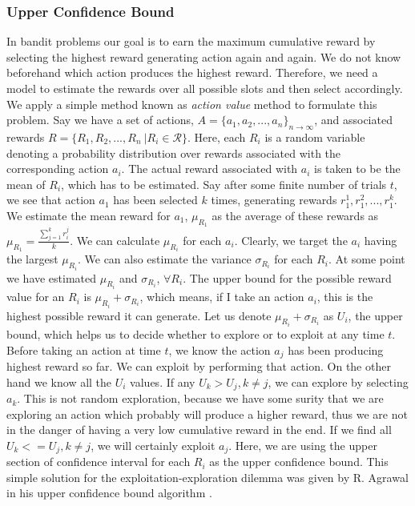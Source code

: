 \documentclass[english]{tktltiki}
\begin{document}
\subsubsection{Upper Confidence Bound}
\label{sec:UCB}
In bandit problems our goal is to earn the maximum cumulative reward by selecting the highest reward generating action again and again. We do not know beforehand which action produces the highest reward. Therefore, we need a model to estimate the rewards over all possible slots and then select accordingly. We apply a simple method known as \textit{action value} method \cite{reinforcement_learning} to formulate this problem. Say we have a set of actions, $A = \{a_1, a_2, ..., a_n\}_{n \to \infty}$, and associated rewards $R = \{R_1, R_2, ..., R_n\ | R_i \in \mathcal{R}\}$. Here, each $R_i$ is a random variable denoting a probability distribution over rewards associated with the corresponding action $a_i$. The actual reward associated with $a_i$ is taken to be the mean of $R_i$, which has to be estimated. Say after some finite number of trials $t$, we see that action $a_1$ has been selected $k$ times, generating rewards $r_1^1, r_1^2, ..., r_1^k$. We estimate the mean reward for $a_1$, $\mu_{R_1}$ as the average of these rewards as $\mu_{R_1} = \frac{\sum_{j = 1}^k{r_i^j}}{k}$. We can calculate $\mu_{R_i}$ for each $a_i$. Clearly, we target the $a_i$ having the largest $\mu_{R_i}$. We can also estimate the variance $\sigma_{R_i}$ for each $R_i$. At some point we have estimated $\mu_{R_i}$ and $\sigma_{R_i}$, $\forall R_i$. The upper bound for the possible reward value for an $R_i$ is $\mu_{R_i} + \sigma_{R_i}$, which means, if I take an action $a_i$, this is the highest possible reward it can generate. Let us denote $\mu_{R_i} + \sigma_{R_i}$ as $U_i$, the upper bound, which helps us to decide whether to explore or to exploit at any time $t$. Before taking an action at time $t$, we know the action $a_j$ has been producing highest reward so far. We can exploit by performing that action. On the other hand we know all the $U_i$ values. If any $U_k > U_j, k \neq j$, we can explore by selecting $a_k$. This is not random exploration, because we have some surity that we are exploring an action which probably will produce a higher reward, thus we are not in the danger of having a very low cumulative reward in the end. If we find all $U_k <= U_j, k \neq j$, we will certainly exploit $a_j$. Here, we are using the upper section of confidence interval for each $R_i$ as the upper confidence bound. This simple solution for the exploitation-exploration dilemma was given by R. Agrawal in his upper confidence bound algorithm \cite{ucb}.
\end{document}
